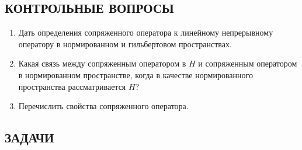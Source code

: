 \documentclass[12pt,a4paper]{article}
\begin{document}
\subsection*{КОНТРОЛЬНЫЕ ВОПРОСЫ}
\begin{enumerate}
\item Дать определения сопряженного оператора к линейному непрерывному оператору в нормированном и гильбертовом пространствах.
\item Какая связь между сопряженным оператором в $H$ и сопряженным оператором в нормированном пространстве, когда в качестве нормированного пространства рассматривается $H$?
\item Перечислить свойства сопряженного оператора.
\end{enumerate}

\subsection*{ЗАДАЧИ}
\end{document}
